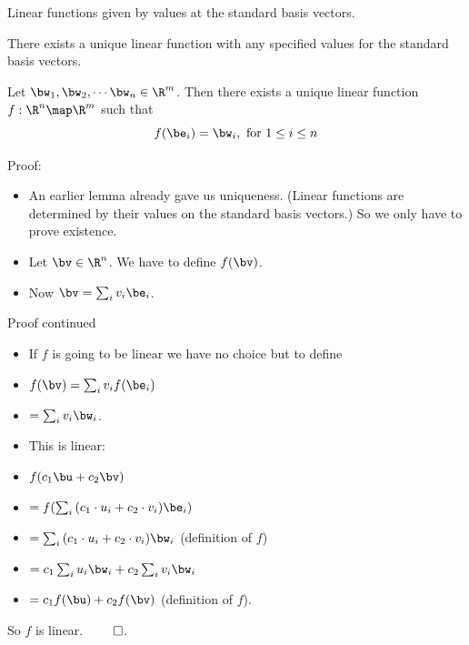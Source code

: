 \documentclass{beamer}
\begin{document}
\begin{frame}{Linear functions given by values at the standard basis vectors.}

There exists a unique linear function with any specified values for the
standard basis vectors.

\pause

\begin{theorem}
Let $\bw_1,\bw_2,\cdots\bw_n \in \R^m$. Then there exists a unique linear
function $f:\R^n\map\R^m$ such that
$$f(\be_i) = \bw_i, \text{ for } 1\leq i \leq n$$
\end{theorem}

\pause

Proof:

\begin{itemize}
\item An earlier lemma already gave us uniqueness.
(Linear functions are determined by their values on the standard basis vectors.)
So we only have to prove existence.
\item Let $\bv\in\R^n$. We have to define $f(\bv)$.
\item Now $\bv = \sum_i{v_i \be_i}$.
\end{itemize}

\end{frame}

\begin{frame}{Proof continued}

\begin{itemize}
\item If $f$ is going to be linear we have no choice but to define
\item $f(\bv) = \sum_i{v_i  f(\be_i)}$
\item $=\sum_i{v_i  \bw_i}$.
\item This is linear:
\item $f(c_1 \bu + c_2\bv)$
\item $=f(\sum_i{(c_1\cdot u_i +c_2 \cdot v_i)\be_i})$
\item $= \sum_i{(c_1\cdot u_i +c_2 \cdot v_i)\bw_i}$ \quad (definition of $f$)
\item $= c_1\sum_i{u_i \bw_i} +c_2\sum_i{v_i \bw_i}$
\item $= c_1f(\bu) +c_2 f(\bv)$ \quad (definition of $f$).
\end{itemize}

\pause

So $f$ is linear. $\qed$.

\end{frame}
\end{document}
